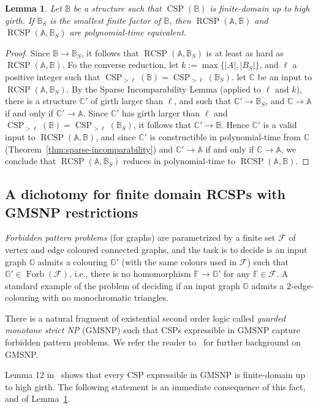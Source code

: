 \documentclass{article}
\newtheorem{lemma}[theorem]{Lemma}
\theoremstyle{definition}
\theoremstyle{remark}
\DeclareMathOperator{\Forb}{Forb}
\DeclareMathOperator{\CSP}{CSP}
\DeclareMathOperator{\RCSP}{RCSP}
\newcommand{\bA}{{\mathbb A}}
\newcommand{\bB}{{\mathbb B}}
\newcommand{\bC}{{\mathbb C}}
\newcommand{\bF}{{\mathbb F}}
\newcommand{\bG}{{\mathbb G}}
\newcommand{\calF}{{\mathcal F}}
\begin{document}
\begin{lemma}\label{lem:up-to-high-girth-restrictions}
    Let $\bB$ be a structure such that $\CSP(\bB)$ is finite-domain up to high girth.
    If $\bB_S$ is the smallest finite factor of $\bB$, then $\RCSP(\bA,\bB)$ and
    $\RCSP(\bA,\bB_S)$ are polynomial-time equivalent.
\end{lemma}
\begin{proof}
    Since $\bB\to \bB_S$, it follows that $\RCSP(\bA,\bB_S)$ is at least as hard
    as $\RCSP(\bA,\bB)$. Fo the converse reduction, let $k := \max\{|A|,|B_S|\}$,
    and $\ell$ a positive integer such that $\CSP_{>\ell}(\bB) = \CSP_{>\ell}(\bB_S)$.
    let $\bC$ be an input to $\RCSP(\bA,\bB_S)$.
    By the Sparse Incomparability Lemma (applied to $\ell$ and $k$), there is a
    structure $\bC'$ of girth larger than $\ell$, and such that $\bC'\to \bB_S$, 
    and $\bC\to \bA$ if and only if $\bC'\to \bA$. Since $\bC'$ has girth larger
    than $\ell$ and $\CSP_{>\ell}(\bB) = \CSP_{>\ell}(\bB_S)$, it follows that
    $\bC'\to \bB$. Hence $\bC'$ is a valid input to $\RCSP(\bA,\bB)$, and since
    $\bC'$ is constructible in polynomial-time from $\bC$
    (Theorem~\ref{thm:sparse-incomparability}) and $\bC'\to \bA$ if and only if $\bC\to \bA$,
    we conclude that $\RCSP(\bA,\bB_S)$ reduces in polynomial-time to $\RCSP(\bA,\bB)$.
\end{proof}


\subsection{A  dichotomy for finite domain RCSPs with GMSNP restrictions}
\label{subsect:GMSNP}

 \emph{Forbidden pattern problems} (for graphs) are parametrized by a finite
set $\calF$ of vertex and edge coloured connected graphs, and the task is to
decide is an input graph $\bG$ admits a colouring $\bG'$ (with the same colours
used in $\calF$) such that $\bG'\in \Forb(\calF)$, i.e., there is no homomorphism
$\bF\to \bG'$ for any $\bF\in \calF$. A standard example of the problem of deciding
if an input graph $\bG$ admits a $2$-edge-colouring with no monochromatic triangles.

There is a natural fragment of existential second order logic called
\emph{guarded monotone strict NP} (GMSNP) such that CSPs expressible in
GMSNP capture forbidden pattern problems. We refer the reader
to~\cite{BarsukovThesis} for further background on GMSNP. 

Lemma 12 in~\cite{guzmanGMSNP} shows that every CSP expressible in GMSNP is
finite-domain up to high girth. The following statement is an immediate consequence
of this fact, and of Lemma~\ref{lem:up-to-high-girth-restrictions}.
\end{document}
